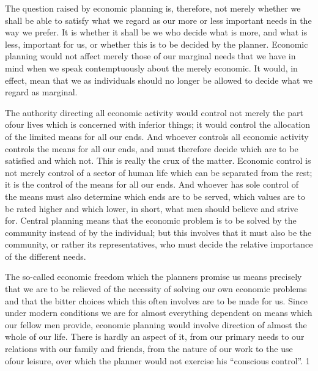 \documentclass[11pt,openany]{book}
\begin{document}
The question raised by economic planning is, therefore, not merely whether we shall be able to satisfy what we regard as our more or less important needs in the way we prefer. It is whether it shall be we who decide what is more, and what is less, important for us, or whether this is to be decided by the planner. Economic planning would not affect merely those of our marginal needs that we have in mind when we speak contemptuously about the merely economic. It would, in effect, mean that we as individuals should no longer be allowed to decide what we regard as marginal.

The authority directing all economic activity would control not merely the part ofour lives which is concerned with inferior things; it would control the allocation of the limited means for all our ends. And whoever controls all economic activity controls the means for all our ends, and must therefore decide which are to be satisfied and which not. This is really the crux of the matter. Economic control is not merely control of a sector of human life which can be separated from the rest; it is the control of the means for all our ends. And whoever has sole control of the means must also determine which ends are to be served, which values are to be rated higher and which lower, in short, what men should believe and strive for. Central planning means that the economic problem is to be solved by the community instead of by the individual; but this involves that it must also be the community, or rather its representatives, who must decide the relative importance of the different needs.

The so-called economic freedom which the planners promise us means precisely that we are to be relieved of the necessity of solving our own economic problems and that the bitter choices which this often involves are to be made for us. Since under modern conditions we are for almost everything dependent on means which our fellow men provide, economic planning would involve direction of almost the whole of our life. There is hardly an aspect of it, from our primary needs to our relations with our family and friends, from the nature of our work to the use ofour leisure, over which the planner would not exercise his ``conscious control''. 1

\begin{center}\textasteriskcentered\hspace{0.9em}\textasteriskcentered\hspace{0.9em}\textasteriskcentered\end{center}
\end{document}
